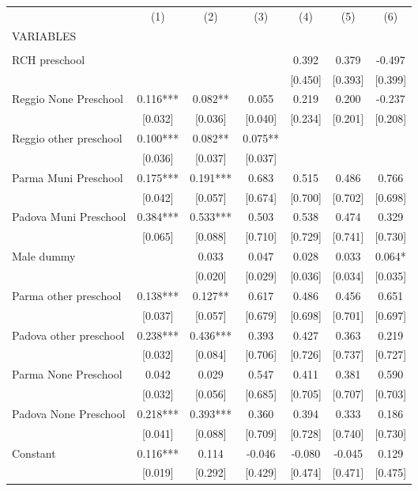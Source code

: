 \begin{tabular}{lcccccc} \hline
 & (1) & (2) & (3) & (4) & (5) & (6) \\
VARIABLES &  &  &  &  &  &  \\ \hline
 &  &  &  &  &  &  \\
RCH preschool &  &  &  & 0.392 & 0.379 & -0.497 \\
 &  &  &  & [0.450] & [0.393] & [0.399] \\
Reggio None Preschool & 0.116*** & 0.082** & 0.055 & 0.219 & 0.200 & -0.237 \\
 & [0.032] & [0.036] & [0.040] & [0.234] & [0.201] & [0.208] \\
Reggio other preschool & 0.100*** & 0.082** & 0.075** &  &  &  \\
 & [0.036] & [0.037] & [0.037] &  &  &  \\
Parma Muni Preschool & 0.175*** & 0.191*** & 0.683 & 0.515 & 0.486 & 0.766 \\
 & [0.042] & [0.057] & [0.674] & [0.700] & [0.702] & [0.698] \\
Padova Muni Preschool & 0.384*** & 0.533*** & 0.503 & 0.538 & 0.474 & 0.329 \\
 & [0.065] & [0.088] & [0.710] & [0.729] & [0.741] & [0.730] \\
Male dummy &  & 0.033 & 0.047 & 0.028 & 0.033 & 0.064* \\
 &  & [0.020] & [0.029] & [0.036] & [0.034] & [0.035] \\
Parma other preschool & 0.138*** & 0.127** & 0.617 & 0.486 & 0.456 & 0.651 \\
 & [0.037] & [0.057] & [0.679] & [0.698] & [0.701] & [0.697] \\
Padova other preschool & 0.238*** & 0.436*** & 0.393 & 0.427 & 0.363 & 0.219 \\
 & [0.032] & [0.084] & [0.706] & [0.726] & [0.737] & [0.727] \\
Parma None Preschool & 0.042 & 0.029 & 0.547 & 0.411 & 0.381 & 0.590 \\
 & [0.032] & [0.056] & [0.685] & [0.705] & [0.707] & [0.703] \\
Padova None Preschool & 0.218*** & 0.393*** & 0.360 & 0.394 & 0.333 & 0.186 \\
 & [0.041] & [0.088] & [0.709] & [0.728] & [0.740] & [0.730] \\
Constant & 0.116*** & 0.114 & -0.046 & -0.080 & -0.045 & 0.129 \\
 & [0.019] & [0.292] & [0.429] & [0.474] & [0.471] & [0.475] \\

\end{tabular}
